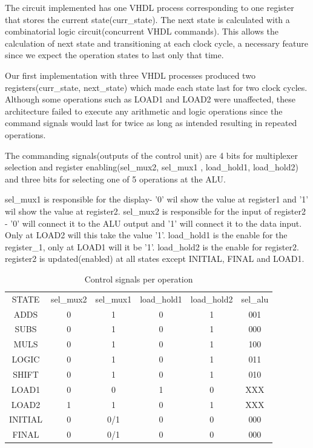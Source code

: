 \documentclass[12pt]{article}
\begin{document}
The circuit implemented has one VHDL process corresponding to one register that stores the current state(curr\_state). The next state is calculated with a combinatorial logic circuit(concurrent VHDL commands). This allows the calculation of next state and transitioning at each clock cycle, a necessary feature since we expect the operation states to last only that time.

Our first implementation with three VHDL processes produced two registers(curr\_state, next\_state) which made each state last for two clock cycles. Although some operations such as LOAD1 and LOAD2 were unaffected, these architecture failed to execute any arithmetic and logic operations since the command signals would last for twice as long as intended resulting in repeated operations.

The commanding signals(outputs of the control unit) are 4 bits for multiplexer selection and register enabling(sel\_mux2, sel\_mux1 , load\_hold1, load\_hold2) and three bits for selecting one of 5 operations at the ALU.

sel\_mux1 is responsible for the display- '0' wil show the value at register1 and '1' wil show the value at register2.
sel\_mux2 is responsible for the input of register2 - '0' will connect it to the ALU output and '1' will connect it to the data input. Only at LOAD2 will this take the value '1'. load\_hold1 is the enable for the register\_1, only at LOAD1 will it be '1'. load\_hold2 is the enable for register2. register2 is updated(enabled) at all states except INITIAL, FINAL and LOAD1.


\begin{table}[H]
	\centering
	\begin{tabular}{cccccc}
		STATE & sel\_mux2 & sel\_mux1 & load\_hold1 & load\_hold2 & sel\_alu\\
		ADDS    & 0 & 1 & 0 & 1 & 001\\
		SUBS    & 0 & 1 & 0 & 1 & 000\\
		MULS    & 0 & 1 & 0 & 1 & 100\\
		LOGIC   & 0 & 1 & 0 & 1 & 011\\
		SHIFT   & 0 & 1 & 0 & 1 & 010\\
		LOAD1   & 0 & 0 & 1 & 0 & XXX\\
		LOAD2   & 1 & 1 & 0 & 1 & XXX\\
		INITIAL & 0 & 0/1 & 0 & 0 & 000\\
		FINAL   & 0 & 0/1 & 0 & 0 & 000\\
	\end{tabular}
	\caption{Control signals per operation}
	\label{tab:my_label}
\end{table}
\end{document}
